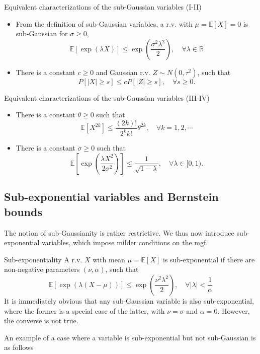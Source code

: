 \documentclass[10pt,handout,english]{beamer}
\newcommand{\E}{\mathbb{E}}
\newcommand{\R}{\mathbb{R}}
\newcommand{\1}{\mathbbm{1}}
\begin{document}
\begin{frame}[allowframebreaks]
\begin{block}{Equivalent characterizations of the sub-Gaussian variables (I-II)}
\begin{itemize}
\item[(I)] From the definition of sub-Gaussian variables, a r.v. with $\mu=\E[X]=0$ is sub-Gaussian for $\sigma\geq 0$,
\[
\E[\exp(\lambda X)]\leq\exp\left(\frac{\sigma^2\lambda^2}{2}\right),\quad\forall\lambda\in\R
\]
\item[(II)] There is a constant $c\geq 0$ and Gaussian r.v. $Z\sim N(0,\tau^2)$, such that
\[
P[\lvert X\rvert\geq s]\leq cP[\lvert Z\rvert\geq s],\quad\forall s\geq0.
\]
\end{itemize}
\end{block}
\begin{block}{Equivalent characterizations of the sub-Gaussian variables (III-IV)}
\begin{itemize}
\item[(III)] There is a constant $\theta\geq 0$ such that
\[
\E\left[X^{2k}\right]\leq\frac{(2k)!}{2^kk!}\theta^{2k},\quad \forall k=1,2,\cdots
\] 
\item[(IV)] There is a constant $\sigma\geq 0$ such that
\[
\E\left[\exp\left(\frac{\lambda X^2}{2\sigma^2}\right)\right]\leq\frac{1}{\sqrt{1-\lambda}},\quad\forall\lambda\in[0,1).
\]
\end{itemize}
\end{block}
\end{frame}
\subsection{Sub-exponential variables and Bernstein bounds}
\begin{frame}
The notion of sub-Gaussianity is rather restrictive. We thus now introduce sub-exponential variables, which impose milder conditions on the mgf.
\begin{definition}{Sub-exponentiality}
A r.v. $X$ with mean $\mu=\E[X]$ is sub-exponential if there are non-negative parameters $(\nu,\alpha)$, such that
\[
\E[\exp(\lambda(X-\mu))]\leq\exp\left(\frac{\nu^2\lambda^2}{2}\right),\quad\forall \lvert\lambda\rvert<\frac{1}{\alpha}
\]
It is immediately obvious that any sub-Gaussian variable is also sub-exponential, where the former is a special case of the latter, with $\nu=\sigma$ and $\alpha=0$. However, the converse is not true. 
\end{definition}
An example of a case where a variable is sub-exponential but not sub-Gaussian is as follows
\end{frame}
\end{document}
